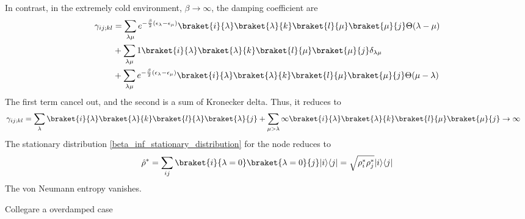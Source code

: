 In contrast, in the extremely cold environment, $\beta \rightarrow \infty$, the damping coefficient are
\begin{equation}
    \begin{split}
        \gamma_{ij;kl}&= \sum_{\lambda\mu}e^{-\frac{\beta}{2}\left(\epsilon_\lambda - \epsilon_\mu\right)}\braket{i}{\lambda}\braket{\lambda}{k}\braket{l}{\mu}\braket{\mu}{j}\Theta(\lambda-\mu)\\
        & + \sum_{\lambda\mu} 1\braket{i}{\lambda}\braket{\lambda}{k}\braket{l}{\mu}\braket{\mu}{j}\delta_{\lambda\mu}\\
        & + \sum_{\lambda\mu} e^{-\frac{\beta}{2}\left(\epsilon_\lambda - \epsilon_\mu\right)}\braket{i}{\lambda}\braket{\lambda}{k}\braket{l}{\mu}\braket{\mu}{j}\Theta(\mu-\lambda)
    \end{split}
\end{equation}
The first term cancel out,  and the second is a sum of Kronecker delta. Thus, it reduces to
\begin{equation}\label{gamma_T=0}
    \begin{split}
        \gamma_{ij;kl}&= \sum_{\lambda}\braket{i}{\lambda}\braket{\lambda}{k}\braket{l}{\lambda}\braket{\lambda}{j}+ \sum_{\mu>\lambda}\infty\braket{i}{\lambda}\braket{\lambda}{k}\braket{l}{\mu}\braket{\mu}{j} \rightarrow \infty
    \end{split}
\end{equation}
The stationary distribution \eqref{beta_inf_stationary_distribution} for the node reduces to
\begin{equation}
    \hat\rho^* = \sum_{ij} \braket{i}{\lambda = 0}\braket{\lambda = 0}{j} \ket{i}\bra{j} = \sqrt{\rho^*_i\rho^*_j} \ket{i}\bra{j}
\end{equation}
The von Neumann entropy vanishes. 

Collegare a overdamped case 


